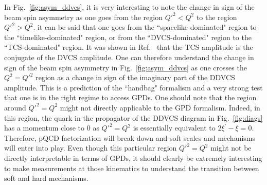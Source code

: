 In Fig.~\ref{fig:asym_ddvcs}, it is very interesting to note the change
in sign of the beam spin asymmetry as one goes from the region $Q'^2<Q^2$
to the region $Q'^2>Q^2$. it can be said that one goes from the
``spacelike-dominated" region to the ``timelike-dominated" region,
or from the ``DVCS-dominated" region to the ``TCS-dominated" region.
It was shown in Ref.~\cite{Muller:2012yq} that the TCS amplitude is the conjugate
of the DVCS amplitude. One can therefore understand the change in
sign of the beam spin asymmetry in Fig.~\ref{fig:asym_ddvcs} as one crosses 
the $Q^2=Q'^2$ region as a change in sign of the imaginary
part of the DDVCS amplitude. This is a prediction of the ``handbag"
formalism and a very strong test that one is in the right regime
to access GPDs. One should note that the region around $Q'^2=Q^2$
might not directly applicable to the GPD formalism. Indeed, in this
region, the quark in the propagator of the DDVCS diagram in Fig.~\ref{fig:diags}
has a momentum close to 0 as $Q'^2=Q^2$ is essentially equivalent
to $2\xi^\prime-\xi=0$. Therefore, pQCD factorization will break down
and soft scales and mechanisms will enter into play. Even though this
particular region $Q'^2=Q^2$ might not be directly interpretable
in terms of GPDs, it should clearly be extremely interesting to
make measurements at those kinematics to understand the transition
between soft and hard mechanisms.


